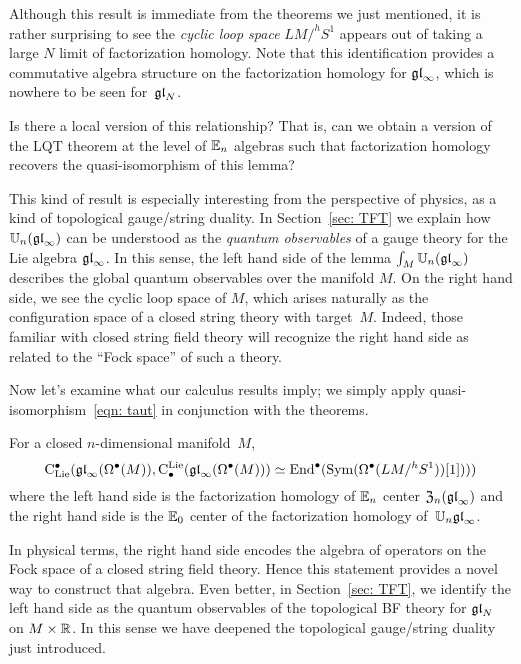 \documentclass[11pt]{amsart}
\numberwithin{equation}{section}
\begin{document}
Although this result is immediate from the theorems we just mentioned,
it is rather surprising to see the {\em cyclic loop space} $LM/^h S^1$ appears out of taking a large $N$ limit of factorization homology.
Note that this identification provides a commutative algebra structure on the factorization homology for ${\mathfrak{gl}}_\infty$, 
which is nowhere to be seen for~${\mathfrak{gl}}_N$.

\begin{qtn}
Is there a local version of this relationship? That is, can we obtain a version of the LQT theorem at the level of $\mathbb E_n$ algebras such that factorization homology recovers the quasi-isomorphism of this lemma?
\end{qtn}

This kind of result is especially interesting from the perspective of physics, 
as a kind of topological gauge/string duality.
In Section~\ref{sec: TFT} we explain how $\mathbb U_n({\mathfrak{gl}}_\infty)$ can be understood as the {\em quantum observables} of a gauge theory for the Lie algebra ${\mathfrak{gl}}_\infty$.
In this sense, the left hand side of the lemma $\int_M \mathbb U_n(\frak{gl}_\infty)$ describes the global quantum observables over the manifold $M$.
On the right hand side, we see the cyclic loop space of $M$,
which arises naturally as the configuration space of a closed string theory with target~$M$.
Indeed, those familiar with closed string field theory will recognize the right hand side as related to the ``Fock space'' of such a theory.

Now let's examine what our calculus results imply;
we simply apply quasi-isomorphism~\eqref{eqn: taut} in conjunction with the theorems.

\begin{lmm}
For a closed $n$-dimensional manifold~$M$, 
\[
{\rm C}_{\rm Lie}^\bullet({\mathfrak{gl}}_\infty(\Omega^\bullet(M)), {\rm C}^{\rm Lie}_\bullet({\mathfrak{gl}}_\infty (\Omega^\bullet(M))) \simeq {\rm End}^\bullet({\rm Sym}(\Omega^\bullet(LM/^h S^1))[1])))
\]
where the left hand side is the factorization homology of $\mathbb E_n$ center ${\frak Z}_n({\mathfrak{gl}}_\infty)$ and the right hand side is the $\mathbb E_0$ center of the factorization homology of~$\mathbb U_n {\mathfrak{gl}}_\infty$.
\end{lmm}

In physical terms, the right hand side encodes the algebra of operators on the Fock space of a closed string field theory.
Hence this statement provides a novel way to construct that algebra.
Even better, in Section~\ref{sec: TFT}, we identify the left hand side as the quantum observables of the topological BF theory for ${\mathfrak{gl}}_N$ on $M \times \mathbb R$.
In this sense we have deepened the topological gauge/string duality just introduced.
\end{document}
